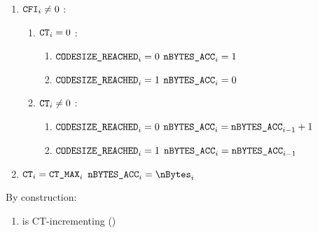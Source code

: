\begin{enumerate}
	\item \If $\texttt{CFI}_{i} \ne 0$ \Then:
	\begin{enumerate}
		\item \If $\texttt{CT}_{i}=0$ \Then:
		\begin{enumerate}
		 	\item \If $\texttt{CODESIZE\_REACHED}_{i}=0$ \Then $\texttt{nBYTES\_ACC}_{i}=1$
		 	\item \If $\texttt{CODESIZE\_REACHED}_{i}=1$ \Then $\texttt{nBYTES\_ACC}_{i}=0$ 
		\end{enumerate}
		\item \If $\texttt{CT}_{i} \neq 0$ \Then:
		\begin{enumerate}
		 	\item \If $\texttt{CODESIZE\_REACHED}_{i}=0$ \Then $\texttt{nBYTES\_ACC}_{i}=\texttt{nBYTES\_ACC}_{i-1}+1$
		 	\item \If $\texttt{CODESIZE\_REACHED}_{i}=1$ \Then $\texttt{nBYTES\_ACC}_{i}=\texttt{nBYTES\_ACC}_{i-1}$ 
		\end{enumerate} 
	\end{enumerate}
	\item \If $\texttt{CT}_{i}=\texttt{CT\_MAX}_{i}$ \Then $\nBytesAcc_{i}=\nBytes_{i}$
\end{enumerate}

\saNote{} By construction:
\begin{enumerate}[resume]
	\item \nBytesAcc{} is CT-incrementing \quad (\trash) 
\end{enumerate}
